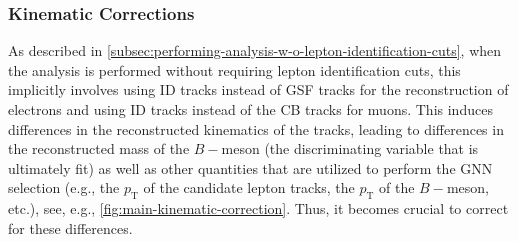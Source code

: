 \subsubsection{Kinematic Corrections}
\label{subsec:kinematic-corrections}
As described in \ref{subsec:performing-analysis-w-o-lepton-identification-cuts}, when the analysis is performed without requiring lepton identification cuts, this implicitly involves using ID tracks instead of GSF tracks for the reconstruction of electrons and using ID tracks instead of the CB tracks for muons. This induces differences in the reconstructed kinematics of the tracks, leading to differences in the reconstructed mass of the $B-$meson (the discriminating variable that is ultimately fit) as well as other quantities that are utilized to perform the GNN selection (e.g., the $p_{\text{T}}$ of the candidate lepton tracks, the $p_{\text{T}}$ of the $B-$meson, etc.), see, e.g., \ref{fig:main-kinematic-correction}. Thus, it becomes crucial to correct for these differences. 
%    

